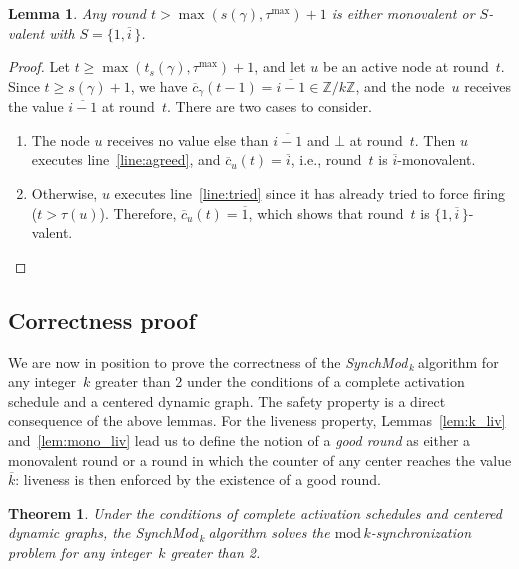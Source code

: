 \documentclass{article}
\newtheorem{lemma}{Lemma}[section]
\newtheorem{theorem}{Theorem}
\newcommand{\cent}{\gamma}
\newcommand{\try}{\tau}
\newcommand{\SM}{{\em SynchMod}$_{\,k}\ $}
\begin{document}
\begin{lemma}\label{lem:mono_bi}
	Any round $t > \max (s(\cent), \try^{\max}) + 1$  is either monovalent or
	$S$-valent with  $S = \{1, \overline{i} \, \}$.
\end{lemma}
\begin{proof}
Let $t \geq \max (t_s(\cent), \try^{\max}) + 1$, and let $u$ be an active node at round~$t$.
Since $t \geq s(\cent)+1$, we have $ \overline{c}_\cent(t - 1) = \overline{i -1 } \in \mathds{Z}/k\mathds{Z} $,
	and the node~$u$ receives the value $ \overline{i - 1}$ at round~$t$.
There are two cases to consider.
\begin{enumerate}
\item The node $u$ receives no value else than $\overline{i -1}$ and $\bot$ at round~$t$.
 Then $u$ executes line~\ref{line:agreed}, and $\overline{c}_u(t) = \overline{ i }$, i.e.,
 	round~$t$ is $ \overline{ i }$-monovalent.
\item Otherwise, $u$ executes line~\ref{line:tried} since it has already tried to force firing ($t > \try(u)$).
Therefore, $\overline{c}_u(t) = \overline{1}$, which shows that round~$t$ is $\{1, \overline{ i } \, \}$-valent.
\end{enumerate}
\end{proof}

\subsection{Correctness proof}

We are now in position to prove the correctness of the \SM algorithm for any integer~$k$ greater than 2
	under the conditions of a complete activation schedule and a  centered dynamic graph.
The safety property is a direct consequence of the above lemmas.
For the liveness property, Lemmas~\ref{lem:k_liv} and~\ref{lem:mono_liv} lead us to define the notion 
	of a \emph{good round}  as either a monovalent round or a round in which  the  counter of any 
	center reaches  the value $\overline{k}$:
	liveness is then enforced by the existence of a good round.

\begin{theorem}\label{thm:k>2}
Under the conditions of complete activation schedules and centered dynamic graphs,
	the \SM algorithm solves the $\mathrm{mod}\,k$-synchronization problem for any integer~$k$ greater than 2.
\end{theorem}
\end{document}
